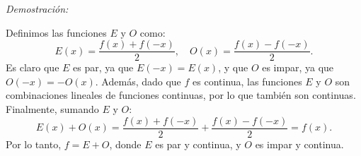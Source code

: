 \textit{Demostración:}

Definimos las funciones $E$ y $O$ como:
\[
E(x) = \frac{f(x) + f(-x)}{2}, \quad O(x) = \frac{f(x) - f(-x)}{2}.
\]
Es claro que $E$ es par, ya que $E(-x) = E(x)$, y que $O$ es impar, ya que $O(-x) = -O(x)$. Además, dado que $f$ es continua, las funciones $E$ y $O$ son combinaciones lineales de funciones continuas, por lo que también son continuas. Finalmente, sumando $E$ y $O$:
\[
E(x) + O(x) = \frac{f(x) + f(-x)}{2} + \frac{f(x) - f(-x)}{2} = f(x).
\]
Por lo tanto, $f = E + O$, donde $E$ es par y continua, y $O$ es impar y continua.